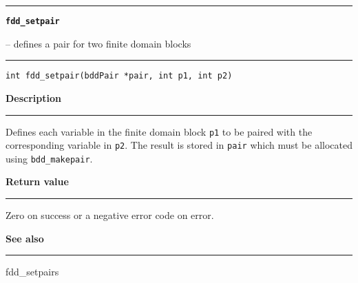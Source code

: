 \begin{minipage}{\textwidth}

\noindent\begin{minipage}{\textwidth}
\rule{\textwidth}{0.5mm}
{\tt\bf fdd\_setpair }
\--- defines a pair for two finite domain blocks  \hspace{\fill}
\\\rule[1.5ex]{\textwidth}{0.5mm}
\end{minipage}

\noindent\begin{verbatim}
int fdd_setpair(bddPair *pair, int p1, int p2) 
\end{verbatim}

\vspace{\parsep}\noindent
{\bf Description}\\\rule[1.5ex]{\textwidth}{0.2mm}\vspace{-1.5ex}\setlength{\parindent}{1em}
Defines each variable in the finite domain block {\tt p1} to
           be paired with the corresponding variable in {\tt p2}. The result
	   is stored in {\tt pair} which must be allocated using
	   {\tt bdd\_makepair}. 

\setlength{\parindent}{0em}\vspace{\parsep}\vspace{\baselineskip}\noindent
{\bf Return value}\\\rule[1.5ex]{\textwidth}{0.2mm}\vspace{-1.5ex}
Zero on success or a negative error code on error. 

\vspace{\parsep}\vspace{\baselineskip}\noindent
{\bf See also}\\\rule[1.5ex]{\textwidth}{0.2mm}\vspace{-1.5ex}
fdd\_setpairs 
\end{minipage}
\vspace{8ex}
